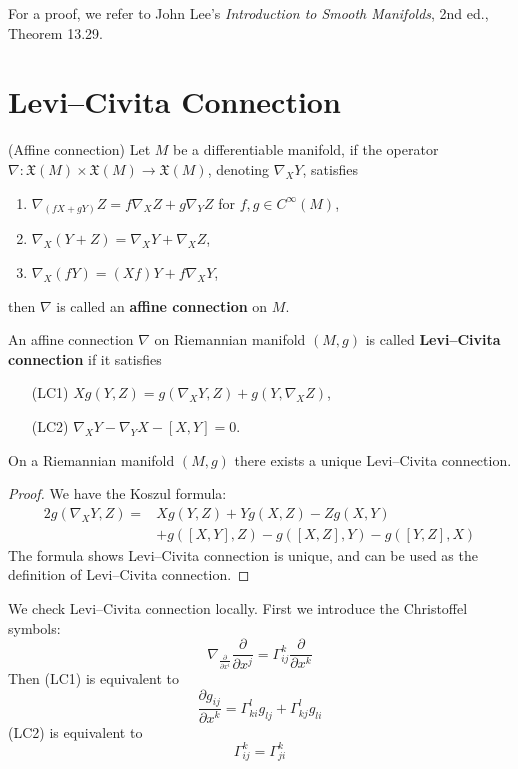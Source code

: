 For a proof, we refer to John Lee's \emph{Introduction to Smooth Manifolds}, 2nd ed., Theo\-rem 13.29.

\section{Levi--Civita Connection}

\begin{defn}(Affine connection)
    Let $M$ be a differentiable manifold, if the operator $\nabla:\mathfrak{X}(M)\times\mathfrak{X}(M)\to\mathfrak{X}(M)$, denoting $\nabla_XY$, satisfies
    \begin{enumerate}[(1)]
        \item $\nabla_{(fX+gY)}Z=f\nabla_XZ+g\nabla_YZ$ for $f,g\in C^\infty(M)$,
        \item $\nabla_X(Y+Z)=\nabla_XY+\nabla_XZ$,
        \item $\nabla_X(fY)=(Xf)Y+f\nabla_XY$,
    \end{enumerate}
    then $\nabla$ is called an \textbf{affine connection} on $M$.
\end{defn}

\begin{defn}
    An affine connection $\nabla$ on Riemannian manifold $(M,g)$ is called \textbf{Levi--Civita connection} if it satisfies
    \begin{itemize}
        \item[(LC1)] $Xg(Y,Z)=g(\nabla_XY,Z)+g(Y,\nabla_XZ)$,
        \item[(LC2)] $\nabla_XY-\nabla_YX-[X,Y]=0$.
    \end{itemize}
\end{defn}

\begin{prop}
    On a Riemannian manifold $(M,g)$ there exists a unique Levi--Civita connection.
\end{prop}
\begin{proof}
    We have the Koszul formula:
    \begin{align*}
        2g(\nabla_XY,Z)=&Xg(Y,Z)+Yg(X,Z)-Zg(X,Y)\\
        &+g([X,Y],Z)-g([X,Z],Y)-g([Y,Z],X)
    \end{align*}
    The formula shows Levi--Civita connection is unique, and can be used as the definition of Levi--Civita connection.
\end{proof}

We check Levi--Civita connection locally.
First we introduce the Christoffel symbols:
\[\nabla_{\frac{\partial{}}{\partial{x^i}}}\frac{\partial{}}{\partial{x^j}}=\Gamma^k_{ij}\frac{\partial{}}{\partial{x^k}}\]
Then (LC1) is equivalent to
\[\frac{\partial{g_{ij}}}{\partial{x^k}}=\Gamma^l_{ki}g_{lj}+\Gamma^l_{kj}g_{li}\]
(LC2) is equivalent to
\[\Gamma^k_{ij}=\Gamma^k_{ji}\]

